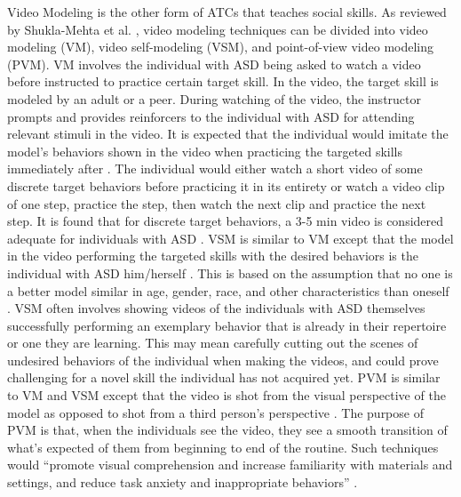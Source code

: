 Video Modeling is the other form of ATCs that teaches social skills.  As reviewed by Shukla-Mehta et al. \cite{shukla2009evaluating}, video modeling techniques can be divided into video modeling (VM), video self-modeling (VSM), and point-of-view video modeling (PVM).  VM involves the individual with ASD being asked to watch a video before instructed to practice certain target skill.  In the video, the target skill is modeled by an adult or a peer.  During watching of the video, the instructor prompts and provides reinforcers to the individual with ASD for attending relevant stimuli in the video.  It is expected that the individual would imitate the model's behaviors shown in the video when practicing the targeted skills immediately after \cite{bellini2007meta, graetz2006show}.  The individual would either watch a short video of some discrete target behaviors before practicing it in its entirety or watch a video clip of one step, practice the step, then watch the next clip and practice the next step.  It is found that for discrete target behaviors, a 3-5 min video is considered adequate for individuals with ASD \cite{buggey2005video}.  VSM is similar to VM except that the model in the video performing the targeted skills with the desired behaviors is the individual with ASD him/herself \cite{hitchcock2003video}.  This is based on the assumption that no one is a better model similar in age, gender, race, and other characteristics than oneself \cite{bandura1969principles, buggey1999training}.  VSM often involves showing videos of the individuals with ASD themselves successfully performing an exemplary behavior that is already in their repertoire or one they are learning.  This may mean carefully cutting out the scenes of undesired behaviors of the individual when making the videos, and could prove challenging for a novel skill the individual has not acquired yet.  PVM is similar to VM and VSM except that the video is shot from the visual perspective of the model as opposed to shot from a third person's perspective \cite{hine2006using}.  The purpose of PVM is that, when the individuals see the video, they see a smooth transition of what's expected of them from beginning to end of the routine.  Such techniques would ``promote visual comprehension and increase familiarity with materials and settings, and reduce task anxiety and inappropriate behaviors'' \cite{shukla2009evaluating}.

